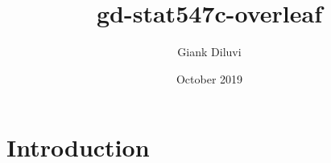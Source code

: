 \documentclass{article}
\title{gd-stat547c-overleaf}
\author{Giank Diluvi}
\date{October 2019}
\begin{document}
\maketitle

\section{Introduction}
\end{document}
